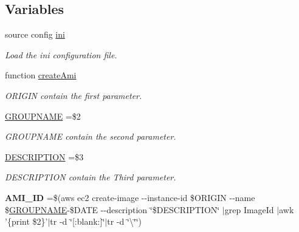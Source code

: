 \subsection*{Variables}
\begin{DoxyCompactItemize}
\item 
\hypertarget{aws-toolkit_8bash_a3248a08efc20db20d0c7e801ef800462}{source config \hyperlink{aws-toolkit_8bash_a3248a08efc20db20d0c7e801ef800462}{ini}}\label{aws-toolkit_8bash_a3248a08efc20db20d0c7e801ef800462}

\begin{DoxyCompactList}\small\item\em Load the ini configuration file. \end{DoxyCompactList}\item 
function \hyperlink{aws-toolkit_8bash_a2ebd8586d38b898323df862fe6082064}{create\-Ami}
\begin{DoxyCompactList}\small\item\em O\-R\-I\-G\-I\-N contain the first parameter. \end{DoxyCompactList}\item 
\hypertarget{aws-toolkit_8bash_ab8d145e061d6e18501a75ed475c34857}{\hyperlink{aws-toolkit_8bash_ab8d145e061d6e18501a75ed475c34857}{G\-R\-O\-U\-P\-N\-A\-M\-E} =\$2}\label{aws-toolkit_8bash_ab8d145e061d6e18501a75ed475c34857}

\begin{DoxyCompactList}\small\item\em G\-R\-O\-U\-P\-N\-A\-M\-E contain the second parameter. \end{DoxyCompactList}\item 
\hypertarget{aws-toolkit_8bash_ae8b66c2a8e7dc444505a64d46aa55e89}{\hyperlink{aws-toolkit_8bash_ae8b66c2a8e7dc444505a64d46aa55e89}{D\-E\-S\-C\-R\-I\-P\-T\-I\-O\-N} =\$3}\label{aws-toolkit_8bash_ae8b66c2a8e7dc444505a64d46aa55e89}

\begin{DoxyCompactList}\small\item\em D\-E\-S\-C\-R\-I\-P\-T\-I\-O\-N contain the Third parameter. \end{DoxyCompactList}\item 
\hypertarget{aws-toolkit_8bash_addf3284bd9eeca71bebfeb9491241bf4}{{\bfseries A\-M\-I\-\_\-\-I\-D} =\$(aws ec2 create-\/image -\/-\/instance-\/id \$O\-R\-I\-G\-I\-N -\/-\/name \$\hyperlink{aws-toolkit_8bash_ab8d145e061d6e18501a75ed475c34857}{G\-R\-O\-U\-P\-N\-A\-M\-E}-\/\$D\-A\-T\-E -\/-\/description \char`\"{}\$D\-E\-S\-C\-R\-I\-P\-T\-I\-O\-N\char`\"{} $\vert$grep Image\-Id $\vert$awk '\{print \$2\}'$\vert$tr -\/d \char`\"{}\mbox{[}\-:blank\-:\mbox{]}\char`\"{}$\vert$tr -\/d \char`\"{}\textbackslash{}\char`\"{}\char`\"{})}\label{aws-toolkit_8bash_addf3284bd9eeca71bebfeb9491241bf4}


\end{DoxyCompactItemize}
